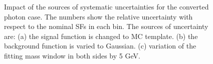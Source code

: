 \begin{figure}[!htbp]
\centering
{}
\quad
{}

\caption [] {Impact of the sources of systematic uncertainties for the converted photon case. The numbers show the relative uncertainty with respect to the nominal SFs in each bin. The sources of uncertainty are: (a) the signal function is changed to MC template. (b) the background function is varied to Gaussian. (c) variation of the fitting mass window in both sides by 5 GeV.}
%
\label{fig:impact_of_uncertainty_converted}
\end{figure}

\newpage

